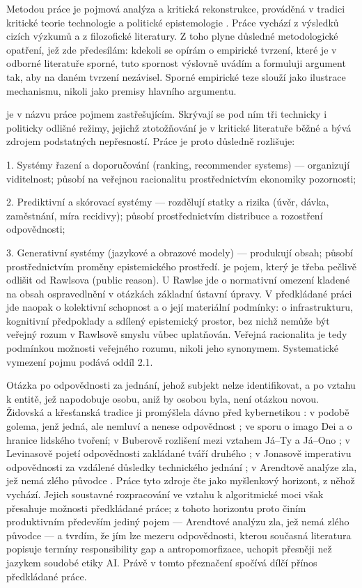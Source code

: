 Metodou práce je pojmová analýza a kritická rekonstrukce, prováděná v tradici kritické teorie technologie \parencite{Feenberg02} a politické epistemologie \parencite{Coeckelbergh23}.
Práce vychází z výsledků cizích výzkumů a z filozofické literatury.
Z toho plyne důsledné metodologické opatření, jež zde předesílám: kdekoli se opírám o empirické tvrzení, které je v odborné literatuře sporné, tuto spornost výslovně uvádím a formuluji argument tak, aby na daném tvrzení nezávisel.
Sporné empirické teze slouží jako ilustrace mechanismu, nikoli jako premisy hlavního argumentu.


 je v názvu práce pojmem zastřešujícím.
Skrývají se pod ním tři technicky i politicky odlišné režimy, jejichž ztotožňování je v kritické literatuře běžné a bývá zdrojem podstatných nepřesností.
Práce je proto důsledně rozlišuje:


1. Systémy řazení a doporučování (ranking, recommender systems) — organizují viditelnost; působí na veřejnou racionalitu prostřednictvím ekonomiky pozornosti;


2. Prediktivní a skórovací systémy — rozdělují statky a rizika (úvěr, dávka, zaměstnání, míra recidivy); působí prostřednictvím distribuce a rozostření odpovědnosti;


3. Generativní systémy (jazykové a obrazové modely) — produkují obsah; působí prostřednictvím proměny epistemického prostředí.
 je pojem, který je třeba pečlivě odlišit od Rawlsova  (public reason).
U Rawlse jde o normativní omezení kladené na obsah ospravedlnění v otázkách základní ústavní úpravy.
 V předkládané práci jde naopak o kolektivní schopnost a o její materiální podmínky: o infrastrukturu, kognitivní předpoklady a sdílený epistemický prostor, bez nichž nemůže být veřejný rozum v Rawlsově smyslu vůbec uplatňován.
 Veřejná racionalita je tedy podmínkou možnosti veřejného rozumu, nikoli jeho synonymem.
Systematické vymezení pojmu podává oddíl 2.1.


Otázka po odpovědnosti za jednání, jehož subjekt nelze identifikovat, a po vztahu k entitě, jež napodobuje osobu, aniž by osobou byla, není otázkou novou.
Židovská a křesťanská tradice ji promýšlela dávno před kybernetikou \parencite{Ellul64}: v podobě golema, jenž jedná, ale nemluví a nenese odpovědnost \parencite{Scholem65}; ve sporu o imago Dei a o hranice lidského tvoření; v Buberově rozlišení mezi vztahem Já–Ty a Já–Ono \parencite{Buber70};
v Levinasově pojetí odpovědnosti zakládané tváří druhého \parencite{Levinas69}; v Jonasově imperativu odpovědnosti za vzdálené důsledky technického jednání \parencite{Jonas84};
 v Arendtově analýze zla, jež nemá zlého původce \parencite{Arendt63,Arendt03}.
Práce tyto zdroje čte jako myšlenkový horizont, z něhož vychází.
Jejich soustavné rozpracování ve vztahu k algoritmické moci však přesahuje možnosti předkládané práce;
z tohoto horizontu proto činím produktivním především jediný pojem — Arendtové analýzu zla, jež nemá zlého původce — a tvrdím, že jím lze mezeru odpovědnosti, kterou současná literatura popisuje termíny responsibility gap a antropomorfizace, uchopit přesněji než jazykem soudobé etiky AI.
Právě v tomto přeznačení spočívá dílčí přínos předkládané práce.


